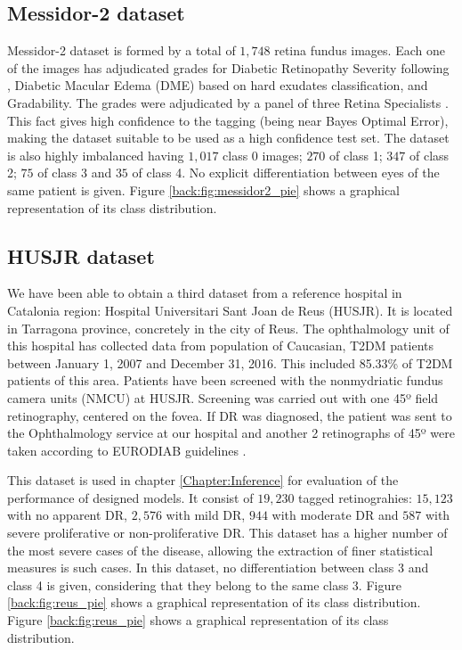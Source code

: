\subsection{Messidor-2 dataset}\label{dataset:mesidor2}

Messidor-2 dataset \citep{decenciere_feedback_2014} is formed by a total of $1,748$ retina fundus images. Each one of the images has adjudicated grades for Diabetic Retinopathy Severity following \citep{diaclass}, Diabetic Macular Edema (DME) based on hard exudates classification, and Gradability. The grades were adjudicated by a panel of three Retina Specialists \citep{google_brain_messidor2}. This fact gives high confidence to the tagging (being near Bayes Optimal Error), making the dataset suitable to be used as a high confidence test set. The dataset is also highly imbalanced having $1,017$ class 0 images; $270$ of class 1; $347$ of class 2; $75$ of class 3 and $35$ of class 4. No explicit differentiation between eyes of the same patient is given. Figure \ref{back:fig:messidor2_pie} shows a graphical representation of its class distribution.

\subsection{HUSJR dataset}\label{dataset:reus}

We have been able to obtain a third dataset from a reference hospital in Catalonia region: Hospital Universitari Sant Joan de Reus (HUSJR). It is located in Tarragona province, concretely in the city of Reus. The ophthalmology unit of this hospital has collected data from population of Caucasian, T2DM patients between January 1, 2007 and December 31, 2016. This included 85.33\% of T2DM patients of this area. Patients have been screened with the nonmydriatic fundus camera units (NMCU) at HUSJR. Screening was carried out with one 45º field retinography, centered on the fovea. If DR was diagnosed, the patient was sent to the Ophthalmology service at our hospital and another 2 retinographs of 45º were taken according to EURODIAB guidelines \citep{aldington1995methodology}.

This dataset is used in chapter \ref{Chapter:Inference} for evaluation of the performance of designed models. It consist of $19,230$ tagged retinograhies: $15,123$ with no apparent DR, $2,576$ with mild DR, $944$ with moderate DR and $587$ with severe proliferative or non-proliferative DR. This dataset has a higher number of the most severe cases of the disease, allowing the extraction of finer statistical measures is such cases. In this dataset, no differentiation between class 3 and class 4 is given, considering that they belong to the same class 3. Figure \ref{back:fig:reus_pie} shows a graphical representation of its class distribution. Figure \ref{back:fig:reus_pie} shows a graphical representation of its class distribution.

